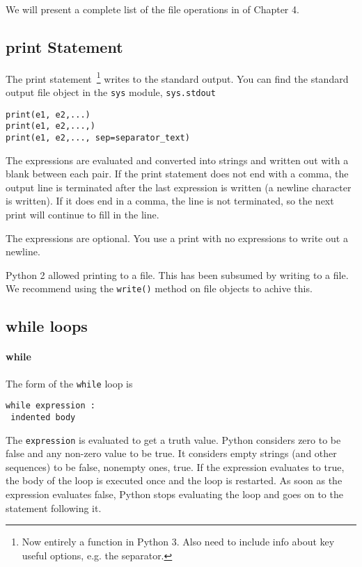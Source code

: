 We will present a complete list of
the file operations in \href{chap4.html\#22958}{} of Chapter 4.

\subsection{print Statement}
\label{print-statement}

The print statement~\footnote{Now entirely a function in Python 3. Also need to include info about key useful options, e.g. the separator.} writes
to the standard output. You can find the standard output file object in
the \texttt{sys} module, \texttt{sys.stdout}

\begin{verbatim}
print(e1, e2,...)
print(e1, e2,...,)
print(e1, e2,..., sep=separator_text)
\end{verbatim}

The expressions are evaluated and
converted into strings and written out with a blank between each pair.
If the print statement does not end with a comma, the output line is
terminated after the last expression is written (a newline character is
written). If it does end in a comma, the line is not terminated, so the
next print will continue to fill in the line.

The expressions are optional. You
use a print with no expressions to write out a newline.

Python 2 allowed printing to a file. This has been subsumed by writing to a file. We recommend using the \texttt{write()} method on file objects to achive this.


\subsection{while loops}
\label{while-loops}

\paragraph{while}
\label{while-statement}

The form of the \texttt{while} loop is

\begin{verbatim}
while expression :
 indented body
\end{verbatim}

The \texttt{expression} is evaluated
to get a truth value. Python considers zero to be false and any non-zero
value to be true. It considers empty strings (and other sequences) to be
false, nonempty ones, true. If the expression evaluates to true, the
body of the loop is executed once and the loop is restarted. As soon as
the expression evaluates false, Python stops evaluating the loop and
goes on to the statement following it.

